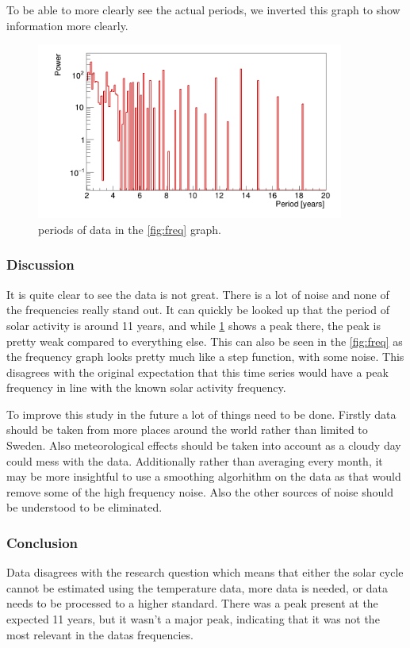 To be able to more clearly see the actual periods, we inverted this graph to show information more clearly.

\begin{figure}[H]
    \centering
    \includegraphics[width=0.9\textwidth]{../plots/solar/period_analysis.png}
    \caption{periods of data in the \ref{fig:freq} graph.}
    \label{fig:period}
\end{figure}

\subsubsection{Discussion}

It is quite clear to see the data is not great. There is a lot of noise and none of the frequencies really stand out. It can quickly be looked up that the period of solar activity is around 11 years, and while \ref{fig:period} shows a peak there, the peak is pretty weak compared to everything else. This can also be seen in the \ref{fig:freq} as the frequency graph looks pretty much like a step function, with some noise. This disagrees with the original expectation that this time series would have a peak frequency in line with the known solar activity frequency.

To improve this study in the future a lot of things need to be done. Firstly data should be taken from more places around the world rather than limited to Sweden. Also meteorological effects should be taken into account as a cloudy day could mess with the data. Additionally rather than averaging every month, it may be more insightful to use a smoothing algorhithm on the data as that would remove some of the high frequency noise. Also the other sources of noise should be understood to be eliminated.

\subsubsection{Conclusion}

Data disagrees with the research question which means that either the solar cycle cannot be estimated using the temperature data, more data is needed, or data needs to be processed to a higher standard. There was a peak present at the expected 11 years, but it wasn't a major peak, indicating that it was not the most relevant in the datas frequencies.